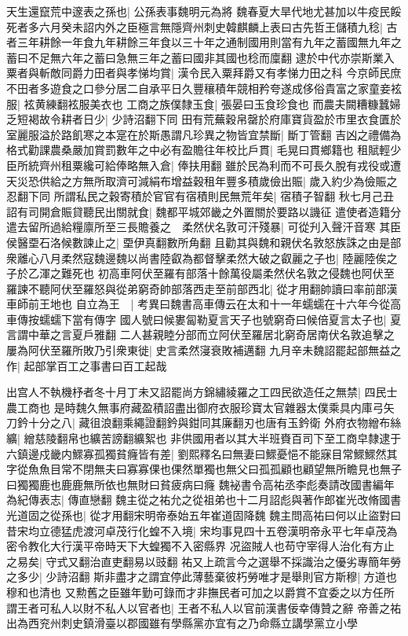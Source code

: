 天生還竄荒中邃表之孫也|{
	公孫表事魏明元為將}
魏春夏大旱代地尤甚加以牛疫民餒死者多六月癸未詔内外之臣極言無隱齊州刺史韓麒麟上表曰古先哲王儲積九稔|{
	古者三年耕餘一年食九年耕餘三年食以三十年之通制國用則當有九年之蓄國無九年之蓄曰不足無六年之蓄曰急無三年之蓄曰國非其國也稔而廩翻}
逮於中代亦崇斯業入粟者與斬敵同爵力田者與孝悌均賞|{
	漢令民入粟拜爵又有孝悌力田之科}
今京師民庶不田者多遊食之口參分居二自承平日久豐穰積年競相矜夸遂成侈俗貴富之家童妾袨服|{
	袨黄練翻袨服美衣也}
工商之族僕隸玉食|{
	張晏曰玉食珍食也}
而農夫闕糟糠蠶婦乏短褐故令耕者日少|{
	少詩沼翻下同}
田有荒蕪穀帛罄於府庫寶貨盈於市里衣食匱於室麗服溢於路飢寒之本寔在於斯愚謂凡珍異之物皆宜禁斷|{
	斷丁管翻}
吉凶之禮備為格式勸課農桑嚴加賞罰數年之中必有盈贍往年校比戶貫|{
	毛晃曰貫鄉籍也}
租賦輕少臣所統齊州租粟纔可給俸略無入倉|{
	俸扶用翻}
雖於民為利而不可長久脫有戎役或遭天災恐供給之方無所取濟可減絹布增益穀租年豐多積歲儉出賑|{
	歲入約少為儉賑之忍翻下同}
所謂私民之穀寄積於官官有宿積則民無荒年矣|{
	宿積子智翻}
秋七月己丑詔有司開倉賑貸聽民出關就食|{
	魏都平城郊畿之外置關於要路以譏征}
遣使者造籍分遣去留所過給糧廪所至三長贍養之　柔然伏名敦可汗殘暴|{
	可從刋入聲汗音寒}
其臣侯醫垔石洛候數諫止之|{
	垔伊真翻數所角翻}
且勸其與魏和親伏名敦怒族誅之由是部衆離心八月柔然寇魏邊魏以尚書陸叡為都督擊柔然大破之叡麗之子也|{
	陸麗陸俟之子於乙渾之難死也}
初高車阿伏至羅有部落十餘萬役屬柔然伏名敦之侵魏也阿伏至羅諫不聽阿伏至羅怒與從弟窮奇帥部落西走至前部西北|{
	從才用翻帥讀曰率前部漢車師前王地也}
自立為王　|{
	考異曰魏書高車傳云在太和十一年蠕蠕在十六年今從高車傳按蠕蠕下當有傳字}
國人號曰候婁匐勒夏言天子也號窮奇曰候倍夏言太子也|{
	夏言謂中華之言夏戶雅翻}
二人甚親睦分部而立阿伏至羅居北窮奇居南伏名敦追擊之屢為阿伏至羅所敗乃引衆東徙|{
	史言柔然寖衰敗補邁翻}
九月辛未魏詔罷起部無益之作|{
	起部掌百工之事書曰百工起哉}


出宫人不執機杼者冬十月丁未又詔罷尚方錦繡綾羅之工四民欲造任之無禁|{
	四民士農工商也}
是時魏久無事府藏盈積詔盡出御府衣服珍寶太官雜器太僕乘具内庫弓矢刀鈐十分之八|{
	藏徂浪翻乘繩證翻鈐與鉗同其廉翻刃也唐有玉鈐衛}
外府衣物繒布絲纊|{
	繒慈陵翻帛也纊苦謗翻纊絮也}
非供國用者以其大半班賚百司下至工商皁隸逮于六鎮邊戍畿内鰥寡孤獨貧癃皆有差|{
	劉熙釋名曰無妻曰鰥憂悒不能寐目常鰥鰥然其字從魚魚目常不閉無夫曰寡寡倮也倮然單獨也無父曰孤孤顧也顧望無所瞻見也無子曰獨獨鹿也鹿鹿無所依也無財曰貧疲病曰癃}
魏袐書令高祐丞李彪奏請改國書編年為紀傳表志|{
	傳直戀翻}
魏主從之祐允之從祖弟也十二月詔彪與著作郎崔光改脩國書光道固之從孫也|{
	從才用翻宋明帝泰始五年崔道固降魏}
魏主問高祐曰何以止盜對曰昔宋均立德猛虎渡河卓茂行化蝗不入境|{
	宋均事見四十五卷漢明帝永平七年卓茂為密令教化大行漢平帝時天下大蝗獨不入密縣界}
况盜賊人也苟守宰得人治化有方止之易矣|{
	守式又翻治直吏翻易以豉翻}
祐又上疏言今之選舉不採識治之優劣專簡年勞之多少|{
	少詩沼翻}
斯非盡才之謂宜停此薄藝棄彼朽勞唯才是舉則官方斯穆|{
	方道也穆和也清也}
又勲舊之臣雖年勤可錄而才非撫民者可加之以爵賞不宜委之以方任所謂王者可私人以財不私人以官者也|{
	王者不私人以官前漢書佞幸傳贊之辭}
帝善之祐出為西兖州刺史鎮滑臺以郡國雖有學縣黨亦宜有之乃命縣立講學黨立小學

